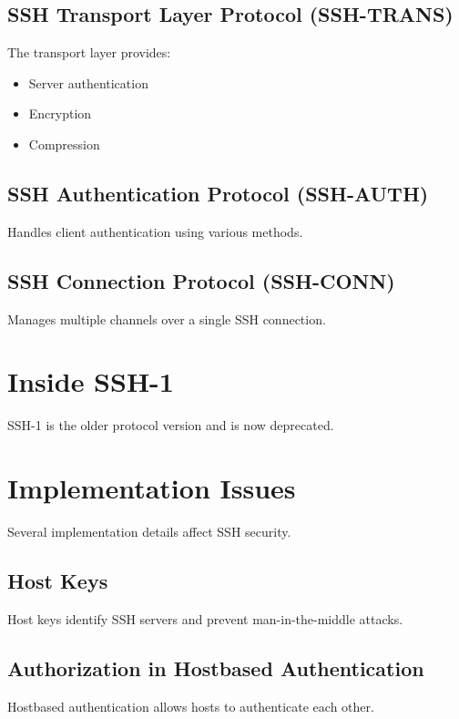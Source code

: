 \documentclass[12pt]{book}
\begin{document}
\subsection{SSH Transport Layer Protocol (SSH-TRANS)}

The transport layer provides:
\begin{itemize}
    \item Server authentication
    \item Encryption
    \item Compression
\end{itemize}

\subsection{SSH Authentication Protocol (SSH-AUTH)}

Handles client authentication using various methods.

\subsection{SSH Connection Protocol (SSH-CONN)}

Manages multiple channels over a single SSH connection.

\section{Inside SSH-1}

SSH-1 is the older protocol version and is now deprecated.

\section{Implementation Issues}

Several implementation details affect SSH security.

\subsection{Host Keys}

Host keys identify SSH servers and prevent man-in-the-middle attacks.

\subsection{Authorization in Hostbased Authentication}

Hostbased authentication allows hosts to authenticate each other.
\end{document}
